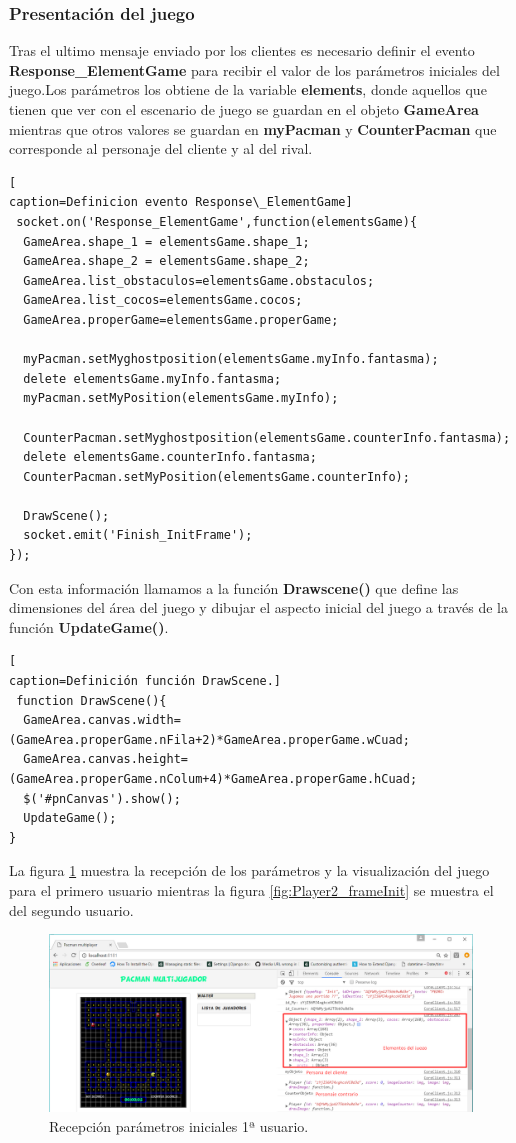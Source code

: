 \subsubsection*{Presentación del juego}
Tras el ultimo mensaje enviado por los clientes es necesario definir el evento \textbf{Response\_ElementGame} para recibir el valor de los parámetros iniciales del juego.Los parámetros los obtiene de la variable \textbf{elements}, donde aquellos que tienen que ver con el escenario de juego se guardan en el objeto \textbf{GameArea} mientras que otros valores se guardan en \textbf{myPacman} y \textbf{CounterPacman} que corresponde al personaje del cliente y al del rival.
\begin{lstlisting}[
caption=Definicion evento Response\_ElementGame]
 socket.on('Response_ElementGame',function(elementsGame){
  GameArea.shape_1 = elementsGame.shape_1;
  GameArea.shape_2 = elementsGame.shape_2;
  GameArea.list_obstaculos=elementsGame.obstaculos;
  GameArea.list_cocos=elementsGame.cocos;
  GameArea.properGame=elementsGame.properGame;

  myPacman.setMyghostposition(elementsGame.myInfo.fantasma);
  delete elementsGame.myInfo.fantasma;
  myPacman.setMyPosition(elementsGame.myInfo);

  CounterPacman.setMyghostposition(elementsGame.counterInfo.fantasma);
  delete elementsGame.counterInfo.fantasma;
  CounterPacman.setMyPosition(elementsGame.counterInfo);
 
  DrawScene();
  socket.emit('Finish_InitFrame');
});
\end{lstlisting}
Con esta información llamamos a la función \textbf{Drawscene()} que define las dimensiones del área del juego y dibujar el aspecto inicial del juego a través de la función \textbf{UpdateGame()}.
\begin{lstlisting}[
caption=Definición función DrawScene.]
 function DrawScene(){
  GameArea.canvas.width=(GameArea.properGame.nFila+2)*GameArea.properGame.wCuad;
  GameArea.canvas.height=(GameArea.properGame.nColum+4)*GameArea.properGame.hCuad;
  $('#pnCanvas').show();
  UpdateGame();
}
\end{lstlisting}
La figura \ref{fig:Player1_frameInit} muestra la recepción de los parámetros y la visualización del juego para el primero usuario mientras la figura \ref{fig:Player2_frameInit} se muestra el del segundo usuario.
\begin{figure}[!h]
\begin{center}
   \includegraphics[width=0.8\linewidth]{Figures/Player1_frameInit}
	\decoRule
	\caption[Recepción parámetros iniciales 1ª usuario.]{Recepción parámetros iniciales 1ª usuario.}
\label{fig:Player1_frameInit}
\end{center}
\end{figure}
